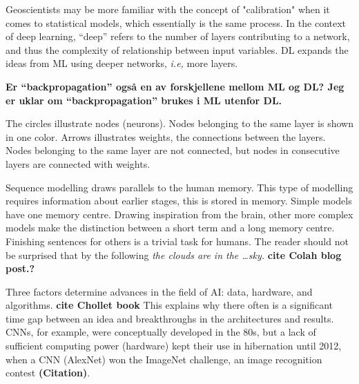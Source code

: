 \documentclass{article}
\begin{document}
Geoscientists may be more familiar with the concept of "calibration" when it comes to statistical models, which essentially is the same process. In the context of deep learning, ``deep'' refers to the number of layers contributing to a network, and thus the complexity of relationship between input variables. DL expands the ideas from ML using deeper networks, \textit{i.e,} more layers.

\textbf{Er ``backpropagation'' også en av forskjellene mellom ML og DL? Jeg er uklar om ``backpropagation'' brukes i ML utenfor DL.}

The circles illustrate nodes (neurons). Nodes belonging to the same layer is shown in one color. Arrows illustrates weights, the connections between the layers. Nodes belonging to the same layer are not connected, but nodes in consecutive layers are connected with weights. 

Sequence modelling draws parallels to the human memory. This type of modelling requires information about earlier stages, this is stored in memory. 
Simple models have one memory centre. Drawing inspiration from the brain, other more complex models make the distinction between a short term and a long memory centre. Finishing sentences for others is a trivial task for humans. The reader should not be surprised that by the following \textit{the clouds are in the \ldots sky.} \textbf{cite Colah blog post.?}


Three factors determine advances in the field of AI: data, hardware, and algorithms. \textbf{cite Chollet book} This explains why there often is a significant time gap between an idea and breakthroughs in the architectures and results. CNNs, for example, were conceptually developed in the 80s, but a lack of sufficient computing power (hardware) kept their use in hibernation until 2012, when a CNN (AlexNet) won the ImageNet challenge, an image recognition contest \textbf{(Citation)}.
\end{document}
